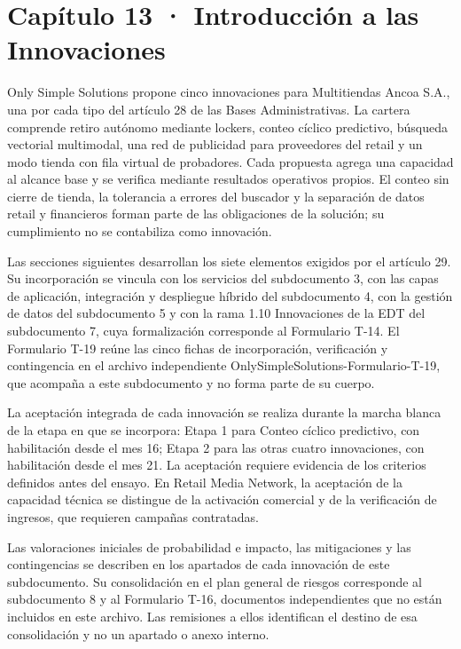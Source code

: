 \documentclass[11pt]{article}
\begin{document}
\tableofcontents
\clearpage

\section{Capítulo 13 · Introducción a las Innovaciones}\label{capuxedtulo-13-introducciuxf3n-a-las-innovaciones}

Only Simple Solutions propone cinco innovaciones para Multitiendas Ancoa S.A., una por cada tipo del artículo 28 de las Bases Administrativas. La cartera comprende retiro autónomo mediante lockers, conteo cíclico predictivo, búsqueda vectorial multimodal, una red de publicidad para proveedores del retail y un modo tienda con fila virtual de probadores. Cada propuesta agrega una capacidad al alcance base y se verifica mediante resultados operativos propios. El conteo sin cierre de tienda, la tolerancia a errores del buscador y la separación de datos retail y financieros forman parte de las obligaciones de la solución; su cumplimiento no se contabiliza como innovación.

Las secciones siguientes desarrollan los siete elementos exigidos por el artículo 29. Su incorporación se vincula con los servicios del subdocumento 3, con las capas de aplicación, integración y despliegue híbrido del subdocumento 4, con la gestión de datos del subdocumento 5 y con la rama 1.10 Innovaciones de la EDT del subdocumento 7, cuya formalización corresponde al Formulario T-14. El Formulario T-19 reúne las cinco fichas de incorporación, verificación y contingencia en el archivo independiente OnlySimpleSolutions-Formulario-T-19, que acompaña a este subdocumento y no forma parte de su cuerpo.

La aceptación integrada de cada innovación se realiza durante la marcha blanca de la etapa en que se incorpora: Etapa 1 para Conteo cíclico predictivo, con habilitación desde el mes 16; Etapa 2 para las otras cuatro innovaciones, con habilitación desde el mes 21. La aceptación requiere evidencia de los criterios definidos antes del ensayo. En Retail Media Network, la aceptación de la capacidad técnica se distingue de la activación comercial y de la verificación de ingresos, que requieren campañas contratadas.

Las valoraciones iniciales de probabilidad e impacto, las mitigaciones y las contingencias se describen en los apartados de cada innovación de este subdocumento. Su consolidación en el plan general de riesgos corresponde al subdocumento 8 y al Formulario T-16, documentos independientes que no están incluidos en este archivo. Las remisiones a ellos identifican el destino de esa consolidación y no un apartado o anexo interno.
\end{document}
